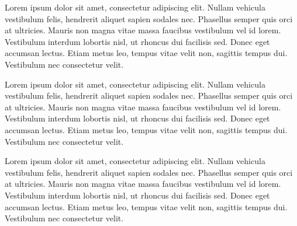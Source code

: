 
Lorem ipsum dolor sit amet, consectetur adipiscing elit. Nullam vehicula vestibulum felis, hendrerit aliquet sapien sodales nec. Phasellus semper quis orci at ultricies. Mauris non magna vitae massa faucibus vestibulum vel id lorem. Vestibulum interdum lobortis nisl, ut rhoncus dui facilisis sed. Donec eget accumsan lectus. Etiam metus leo, tempus vitae velit non, sagittis tempus dui. Vestibulum nec consectetur velit.


Lorem ipsum dolor sit amet, consectetur adipiscing elit. Nullam vehicula vestibulum felis, hendrerit aliquet sapien sodales nec. Phasellus semper quis orci at ultricies. Mauris non magna vitae massa faucibus vestibulum vel id lorem. Vestibulum interdum lobortis nisl, ut rhoncus dui facilisis sed. Donec eget accumsan lectus. Etiam metus leo, tempus vitae velit non, sagittis tempus dui. Vestibulum nec consectetur velit.


Lorem ipsum dolor sit amet, consectetur adipiscing elit. Nullam vehicula vestibulum felis, hendrerit aliquet sapien sodales nec. Phasellus semper quis orci at ultricies. Mauris non magna vitae massa faucibus vestibulum vel id lorem. Vestibulum interdum lobortis nisl, ut rhoncus dui facilisis sed. Donec eget accumsan lectus. Etiam metus leo, tempus vitae velit non, sagittis tempus dui. Vestibulum nec consectetur velit.